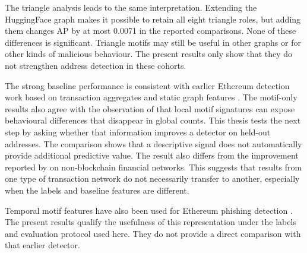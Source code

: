 The triangle analysis leads to the same interpretation. Extending the
HuggingFace graph makes it possible to retain all eight triangle roles, but
adding them changes AP by at most 0.0071 in the reported comparisons. None of
these differences is significant. Triangle motifs may still be useful in other
graphs or for other kinds of malicious behaviour. The present results only show
that they do not strengthen address detection in these cohorts.

The strong baseline performance is consistent with earlier Ethereum detection
work based on transaction aggregates and static graph features
\citep{chen2022phishing, sanjalawe2023atd}. The motif-only results also agree
with the observation of \citet{arnold2024motifs} that local motif signatures can
expose behavioural differences that disappear in global counts. This thesis
tests the next step by asking whether that information improves a detector on
held-out addresses. The comparison shows that a descriptive signal does not
automatically provide additional predictive value. The result
also differs from the improvement reported by \citet{liu2023temporal} on
non-blockchain financial networks. This suggests that results from one type of
transaction network do not necessarily transfer to another, especially when
the labels and baseline features are different.

Temporal motif features have also been used for Ethereum phishing detection
\citep{wang2023temporal}. The present results qualify the usefulness of this
representation under the labels and evaluation protocol used here. They do not
provide a direct comparison with that earlier detector.
